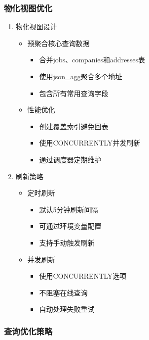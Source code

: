 \subsubsection{物化视图优化}
\begin{enumerate}
  \item 物化视图设计
  \begin{itemize}
    \item 预聚合核心查询数据
    \begin{itemize}
      \item 合并jobs、companies和addresses表
      \item 使用json\_agg聚合多个地址
      \item 包含所有常用查询字段
    \end{itemize}
    \item 性能优化
    \begin{itemize}
      \item 创建覆盖索引避免回表
      \item 使用CONCURRENTLY并发刷新
      \item 通过调度器定期维护
    \end{itemize}
  \end{itemize}

  \item 刷新策略
  \begin{itemize}
    \item 定时刷新
    \begin{itemize}
      \item 默认5分钟刷新间隔
      \item 可通过环境变量配置
      \item 支持手动触发刷新
    \end{itemize}
    \item 并发刷新
    \begin{itemize}
      \item 使用CONCURRENTLY选项
      \item 不阻塞在线查询
      \item 自动处理失败重试
    \end{itemize}
  \end{itemize}
\end{enumerate}

\subsubsection{查询优化策略}

